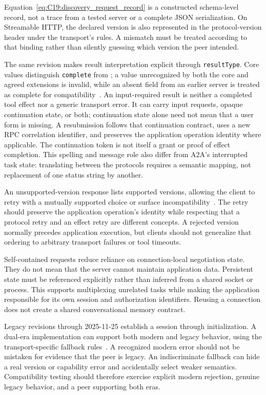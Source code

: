 Equation~\ref{eq:C19:discovery_request_record} is a constructed schema-level record, not a trace from a tested server or a complete JSON serialization. On Streamable HTTP, the declared version is also represented in the protocol-version header under the transport's rules. A mismatch must be treated according to that binding rather than silently guessing which version the peer intended.

The same revision makes result interpretation explicit through \texttt{resultType}. Core values distinguish \texttt{complete} from ; a value unrecognized by both the core and agreed extensions is invalid, while an absent field from an earlier server is treated as complete for compatibility~\cite{mcp2026base}. An input-required result is neither a completed tool effect nor a generic transport error. It can carry input requests, opaque continuation state, or both; continuation state alone need not mean that a user form is missing. A resubmission follows that continuation contract, uses a new RPC correlation identifier, and preserves the application operation identity where applicable. The continuation token is not itself a grant or proof of effect completion. This spelling and message role also differ from A2A's interrupted task state: translating between the protocols requires a semantic mapping, not replacement of one status string by another.

An unsupported-version response lists supported versions, allowing the client to retry with a mutually supported choice or surface incompatibility~\cite{mcp2026compat}. The retry should preserve the application operation's identity while respecting that a protocol retry and an effect retry are different concepts. A rejected version normally precedes application execution, but clients should not generalize that ordering to arbitrary transport failures or tool timeouts.

Self-contained requests reduce reliance on connection-local negotiation state. They do not mean that the server cannot maintain application data. Persistent state must be referenced explicitly rather than inferred from a shared socket or process. This supports multiplexing unrelated tasks while making the application responsible for its own session and authorization identifiers. Reusing a connection does not create a shared conversational memory contract.

Legacy revisions through 2025-11-25 establish a session through initialization. A dual-era implementation can support both modern and legacy behavior, using the transport-specific fallback rules~\cite{mcp2026compat}. A recognized modern error should not be mistaken for evidence that the peer is legacy. An indiscriminate fallback can hide a real version or capability error and accidentally select weaker semantics. Compatibility testing should therefore exercise explicit modern rejection, genuine legacy behavior, and a peer supporting both eras.


